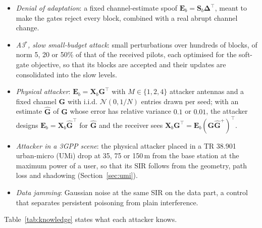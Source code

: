 \documentclass[journal]{IEEEtran}
\theoremstyle{remark}
\begin{document}
\begin{itemize}
the soft-gate objective; the energy on the data also degrades the references the gates compare against.
\item \emph{Denial of adaptation}: a fixed channel-estimate spoof $\bm E_b=\bm S_b\bm\Delta^{\!\top}$,
meant to make the gates reject every block, combined with a real abrupt channel change.
\item \emph{A3$^\ast$, slow small-budget attack}: small perturbations over hundreds of blocks, of norm
5, 20 or 50\% of that of the received pilots, each optimised for the soft-gate objective, so that its
blocks are accepted and their updates are consolidated into the slow levels.
\item \emph{Physical attacker}: $\bm E_b=\bm X_b\bm G^{\!\top}$ with $M\in\{1,2,4\}$ attacker antennas and a
fixed channel $\bm G$ with i.i.d. $\mathcal N(0,1/N)$ entries drawn per seed; with an estimate $\hat{\bm G}$ of $\bm G$ whose error has relative variance $0.1$ or $0.01$, the attacker designs $\bm E_b=\bm X_b\hat{\bm G}^{\!\top}$ for
$\hat{\bm G}$ and the receiver sees $\bm X_b\bm G^{\!\top}=\bm E_b(\bm G\hat{\bm G}^{+})^{\!\top}$.
\item \emph{Attacker in a 3GPP scene}: the physical attacker placed in a TR 38.901 urban-micro (UMi) drop at 35, 75
or 150\,m from the base station at the maximum power of a user, so that its SIR follows from the
geometry, path loss and shadowing (Section~\ref{sec:umi}).
\item \emph{Data jamming}: Gaussian noise at the same SIR on the data part, a control that separates
persistent poisoning from plain interference.
\end{itemize}
Table~\ref{tab:knowledge} states what each attacker knows.
\end{document}
